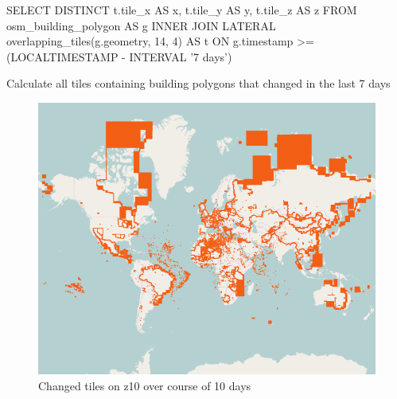 \begin{listing}[H]
  \centering
  \begin{sqlcode}
    SELECT DISTINCT t.tile_x AS x, t.tile_y AS y, t.tile_z AS z
    FROM osm_building_polygon AS g
    INNER JOIN LATERAL overlapping_tiles(g.geometry, 14, 4) AS t
    ON g.timestamp >= (LOCALTIMESTAMP - INTERVAL '7 days')
  \end{sqlcode}
  \caption{Calculate all tiles containing building polygons that changed in the last 7 days}
\end{listing}

\begin{figure}[H]
  \centering
  \includegraphics[width=1\textwidth]{images/changed_tiles_z10.png}
  \caption{Changed tiles on z10 over course of 10 days}
\end{figure}
